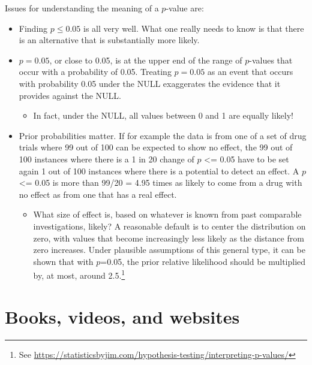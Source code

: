 \documentclass[
  10ptls,
  b5paper]{book}
\providecommand{\tightlist}{%
  \setlength{\itemsep}{0pt}\setlength{\parskip}{0pt}}
\begin{document}
Issues for understanding the meaning of a \(p\)-value are:

\begin{itemize}
\tightlist
\item
  Finding \(p \leq 0.05\) is all very well. What one really needs to know is that there is an alternative that is substantially more likely.
\item
  \(p = 0.05\), or close to 0.05, is at the upper end of the range of \(p\)-values that occur with a probability of 0.05. Treating \(p = 0.05\) as an event that occurs with probability 0.05 under the NULL exaggerates the evidence that it provides against the NULL.

  \begin{itemize}
  \tightlist
  \item
    In fact, under the NULL, all values between 0 and 1 are equally likely!
  \end{itemize}
\item
  Prior probabilities matter. If for example the data is from one of a set of drug trials where 99 out of 100 can be expected to show no effect, the 99 out of 100 instances where there is a 1 in 20 change of \(p\) \textless= 0.05 have to be set again 1 out of 100 instances where there is a potential to detect an effect. A \(p\) \textless= 0.05 is more than 99/20 = 4.95 times as likely to come from a drug with no effect as from one that has a real effect.

  \begin{itemize}
  \tightlist
  \item
    What size of effect is, based on whatever is known from past comparable investigations, likely? A reasonable default is to center the distribution on zero, with values that become increasingly less likely as the distance from zero increases. Under plausible assumptions of this general type, it can be shown that with \(p\)=0.05, the prior relative likelihood should be multiplied by, at most, around 2.5.\footnote{See \url{https://statisticsbyjim.com/hypothesis-testing/interpreting-p-values/}}
  \end{itemize}
\end{itemize}

\backmatter

\hypertarget{app:more}{%
\chapter{Books, videos, and websites}\label{app:more}}
\end{document}
